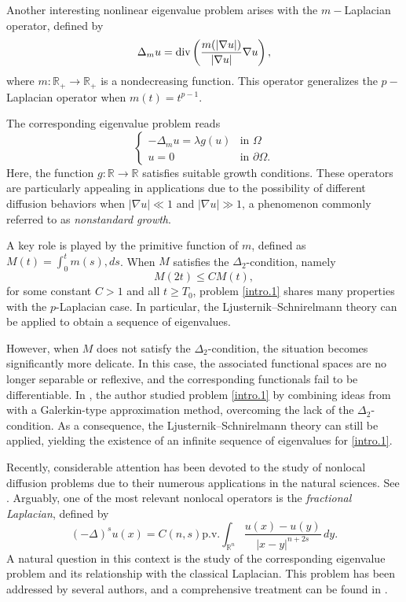\documentclass{amsart}
\newcommand{\R}{{\mathbb R}}
\theoremstyle{remark}
\theoremstyle{definition}
\def\diver{\mathop{\text{\normalfont div}}}
\numberwithin{equation}{section}
\begin{document}
Another interesting nonlinear eigenvalue problem arises with the $m-$Laplacian operator, defined by
$$
\Delta_m u = \diver\left(\frac{m(|\nabla u|)}{|\nabla u|}\nabla u\right),
$$
where $m\colon \R_+\to\R_+$ is a nondecreasing function. This operator generalizes the $p-$Laplacian operator when $m(t)=t^{p-1}$.

The corresponding eigenvalue problem reads
\begin{equation}\label{intro.1}
\begin{cases}
-\Delta_m u=\lambda g(u)& \text{in }\Omega\\
u=0 & \text{in }\partial\Omega.
\end{cases}
\end{equation}
Here, the function $g\colon \R \to \R$ satisfies suitable growth conditions. These operators are particularly appealing in applications due to the possibility of different diffusion behaviors when $|\nabla u|\ll 1$ and $|\nabla u|\gg 1$, a phenomenon commonly referred to as \emph{nonstandard growth}.

A key role is played by the primitive function of $m$, defined as $M(t)=\int_0^t m(s),ds$. When $M$ satisfies the $\Delta_2$-condition, namely
$$
M(2t)\leq C M(t),
$$
for some constant $C>1$ and all $t\geq T_0$, problem \eqref{intro.1} shares many properties with the $p$-Laplacian case. In particular, the Ljusternik--Schnirelmann theory can be applied to obtain a sequence of eigenvalues.

However, when $M$ does not satisfy the $\Delta_2$-condition, the situation becomes significantly more delicate. In this case, the associated functional spaces are no longer separable or reflexive, and the corresponding functionals fail to be differentiable. In \cite{Ti}, the author studied problem \eqref{intro.1} by combining ideas from \cite{Gossez} with a Galerkin-type approximation method, overcoming the lack of the $\Delta_2$-condition. As a consequence, the Ljusternik--Schnirelmann theory can still be applied, yielding the existence of an infinite sequence of eigenvalues for \eqref{intro.1}.

Recently, considerable attention has been devoted to the study of nonlocal diffusion problems due to their numerous applications in the natural sciences. See \cite{AkgirayBooth1988, Constantin2006, Eringen2002, GilboaOsher2008}. Arguably, one of the most relevant nonlocal operators is the \emph{fractional Laplacian}, defined by
$$
(-\Delta)^s u(x) = C(n, s)\text{p.v.}\int_{\R^n} \frac{u(x)-u(y)}{|x-y|^{n+2s}}\, dy.
$$
A natural question in this context is the study of the corresponding eigenvalue problem and its relationship with the classical Laplacian. This problem has been addressed by several authors, and a comprehensive treatment can be found in \cite{MolicaBisciRadulescuServadei2016}.
\end{document}
